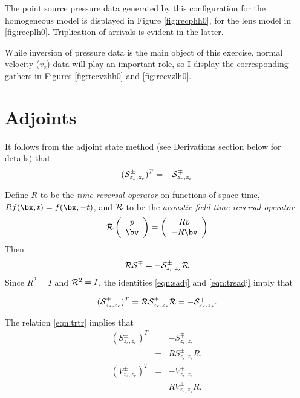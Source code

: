 The point source pressure data generated by this configuration for the
homogeneous model is displayed in Figure \ref{fig:recphh0}, for the
lens model in \ref{fig:recplh0}. Triplication of arrivals is evident in the latter.



While inversion of pressure data is the main object of this exercise,
normal velocity ($v_z$) data will play an important role, so I display
the corresponding gathers in Figures \ref{fig:recvzhh0} and \ref{fig:recvzlh0}.


\section{Adjoints}

It follows from the adjoint state method (see Derivations section
below for details) that
\begin{equation}
  \label{eqn:sadj1}
  ({\cal S}^{\pm}_{z_s, z_r})^T = -{\cal S}^{\mp}_{z_r,z_s}
\end{equation}

Define $R$ to be the {\em time-reversal operator} on functions of
space-time, $Rf(\bx,t) = f(\bx,-t)$, and ${\cal R}$ to be the {\em
  acoustic field time-reversal operator}
\begin{equation}
  \label{eqn:trdef}
  {\cal R} \left(
    \begin{array}{c}
      p\\
      \bv
    \end{array}
  \right) =
  \left(
    \begin{array}{c}
      Rp\\
      -R\bv
    \end{array}
  \right)
\end{equation}
Then 
\begin{equation}
  \label{eqn:trsadj}
  {\cal R}{\cal S}^{\mp} = -{\cal S}^{\pm}_{z_r,z_s}{\cal R}
\end{equation}
Since $R^2 = I$ and ${\cal R}^2 = I$, the identities \ref{eqn:sadj} and \ref{eqn:trsadj} imply that

\begin{equation} 
  \label{eqn:trtr}
 ({\cal S}^{\pm}_{z_s,z_r})^T = {\cal R}{\cal S}_{z_r,z_s}^{\pm}{\cal R}=
 -{\cal S}^{\mp}_{z_r,z_s}.
\end{equation}

The relation \ref{eqn:trtr} implies that
\begin{eqnarray}
  (S^{\pm}_{z_s,z_r})^T &=& -S^{\mp}_{z_r,z_s} \nonumber\\
                        &=& R S^{\pm}_{z_r,z_s}R, \nonumber\\
    (V^{\pm}_{z_s,z_r})^T &=& -V^{\mp}_{z_r,z_s} \nonumber\\
                        &=& R V^{\pm}_{z_r,z_s}R.
                            \label{eqn:trtrcomp}
\end{eqnarray}

